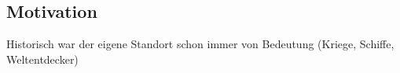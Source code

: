 \subsection{Motivation}

Historisch war der eigene Standort schon immer von Bedeutung (Kriege, Schiffe, Weltentdecker) 